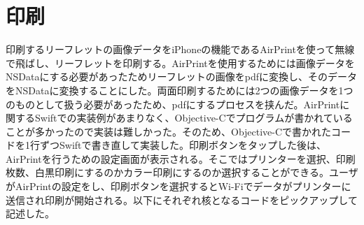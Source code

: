 \section{印刷}
印刷するリーフレットの画像データをiPhoneの機能であるAirPrintを使って無線で飛ばし、リーフレットを印刷する。AirPrintを使用するためには画像データをNSDataにする必要があったためリーフレットの画像をpdfに変換し、そのデータをNSDataに変換することにした。両面印刷するためには2つの画像データを1つのものとして扱う必要があったため、pdfにするプロセスを挟んだ。AirPrintに関するSwiftでの実装例があまりなく、Objective-Cでプログラムが書かれていることが多かったので実装は難しかった。そのため、Objective-Cで書かれたコードを1行ずつSwiftで書き直して実装した。印刷ボタンをタップした後は、AirPrintを行うための設定画面が表示される。そこではプリンターを選択、印刷枚数、白黒印刷にするのかカラー印刷にするのか選択することができる。ユーザがAirPrintの設定をし、印刷ボタンを選択するとWi-Fiでデータがプリンターに送信され印刷が開始される。以下にそれぞれ核となるコードをピックアップして記述した。
